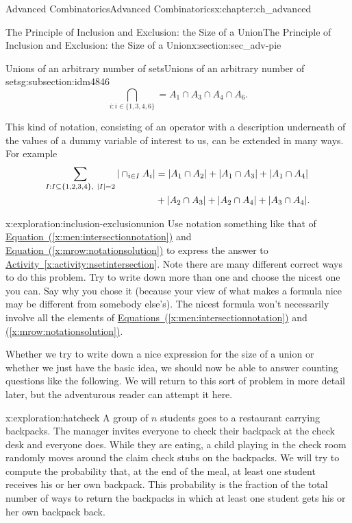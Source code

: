 \documentclass[oneside,10pt,]{book}
\numberwithin{equation}{chapter}
\newcommand{\amp}{&}
\begin{document}
\begin{chapterptx}{Advanced Combinatorics}{}{Advanced Combinatorics}{}{}{x:chapter:ch_advanced}
\begin{sectionptx}{The Principle of Inclusion and Exclusion: the Size of a Union}{}{The Principle of Inclusion and Exclusion: the Size of a Union}{}{}{x:section:sec_adv-pie}
\begin{subsectionptx}{Unions of an arbitrary number of sets}{}{Unions of an arbitrary number of sets}{}{}{g:subsection:idm4846}
\begin{equation}
\bigcap_{i:i\in
\{1,3,4,6\}} = A_1\cap A_3\cap A_4 \cap A_6.\label{x:men:intersectionnotation}
\end{equation}
%
\par
This kind of notation, consisting of an operator with a description underneath of the values of a dummy variable of interest to us, can be extended in many ways. For example%
\begin{align}
\sum_{I:I \subseteq \{1,2,3,4\}, \ |I|=2} |\cap_{i\in I}
A_i|  \amp =  |A_1\cap A_2|+ |A_1\cap A_3|
+|A_1\cap A_4|\notag\\
\amp +  |A_2\cap A_3|+
|A_2\cap A_4| +|A_3\cap A_4|.\label{x:mrow:notationsolution}
\end{align}
%
\begin{exploration}{}{x:exploration:inclusion-exclusionunion}%
Use notation something like that of \hyperref[x:men:intersectionnotation]{Equation~(\ref{x:men:intersectionnotation})} and \hyperref[x:mrow:notationsolution]{Equation~(\ref{x:mrow:notationsolution})} to express the answer to \hyperref[x:activity:nsetintersection]{Activity~\ref{x:activity:nsetintersection}}. Note there are many different correct ways to do this problem. Try to write down more than one and choose the nicest one you can. Say why you chose it (because your view of what makes a formula nice may be different from somebody else's). The nicest formula won't necessarily involve all the elements of \hyperref[x:men:intersectionnotation]{Equations~(\ref{x:men:intersectionnotation})} and \hyperref[x:mrow:notationsolution]{(\ref{x:mrow:notationsolution})}.%
\end{exploration}
Whether we try to write down a nice expression for the size of a union or whether we just have the basic idea, we should now be able to answer counting questions like the following.  We will return to this sort of problem in more detail later, but the adventurous reader can attempt it here.%
\begin{exploration}{}{x:exploration:hatcheck}%
A group of \(n\) students goes to a restaurant carrying backpacks. The manager invites everyone to check their backpack at the check desk and everyone does. While they are eating, a child playing in the check room randomly moves around the claim check stubs on the backpacks. We will try to compute the probability that, at the end of the meal, at least one student receives his or her own backpack.  This probability is the fraction of the total number of ways to return the backpacks in which at least one student gets his or her own backpack back.%
\begin{enumerate}[font=\bfseries,label=(\alph*),ref=\alph*]

\end{enumerate}
\end{exploration}
\end{subsectionptx}
\end{sectionptx}
\end{chapterptx}
\end{document}
